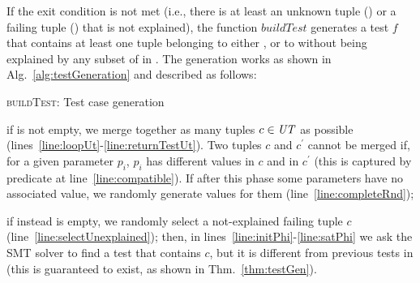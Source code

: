 \begin{tikzborder}{\cite{Gargantini16:validation}}
\begin{tikzborder}{\cite{gargantini_combinatorial_2017}}
\begin{tikzborder}{\cite{gargantini_combinatorial_2017}}
\begin{tikzborder}{\cite{garn2019}}
\begin{tikzborder}{\cite{arcaini2019achieving}}
\begin{tikzborder}{}
If the exit condition is not met (i.e., there is at least an unknown tuple (\ut) or a failing tuple (\ft) that is not explained), the function $\mathit{buildTest}$ generates a test $f$ that contains at least one tuple belonging to either \ut, or to \ft without being explained by any subset of \mfics in \isoMficsSet. The generation works as shown in Alg.~\ref{alg:testGeneration} and described as follows:
\end{tikzborder}
%
\begin{algorithm}[!htb]
	\begin{algorithmic}[1]
		\If{$\ut \neq \emptyset$}
		\label{line:loopUt}
		\label{line:compatible}
		\EndIf
		\State {}
		\EndIf
		\EndFor
		\label{line:completeRnd}
		\State {}\label{line:returnTestUt}
		\Else
		\label{line:selectUnexplained}
		\label{line:initPhi}
		\label{line:satPhi}
		\EndIf
	\end{algorithmic}
	\caption{\textsc{buildTest}: Test case generation}
	\label{alg:testGeneration}
\end{algorithm}
%
\begin{tikzborder}{}
\begin{compactitem}
	\item if \ut is not empty, we merge together as many tuples $c \in \mathit{UT}$ as possible (lines~\ref{line:loopUt}-\ref{line:returnTestUt}). Two tuples $c$ and $c^\prime$ cannot be merged if, for a given parameter $p_i$, $p_i$ has different values in $c$ and in $c^\prime$ (this is captured by predicate \compatible at line~\ref{line:compatible}). If after this phase some parameters have no associated value, we randomly generate values for them (line~\ref{line:completeRnd});
	\item if instead \ut is empty, we randomly select a not-explained failing tuple $c$ (line~\ref{line:selectUnexplained}); then, in lines~\ref{line:initPhi}-\ref{line:satPhi} we ask the SMT solver to find a test that contains $c$, but it is different from previous tests in \ts (this is guaranteed to exist, as shown in Thm.~\ref{thm:testGen}).
\end{compactitem}
\end{tikzborder}


\end{tikzborder}
\end{tikzborder}
\end{tikzborder}
\end{tikzborder}
\end{tikzborder}
